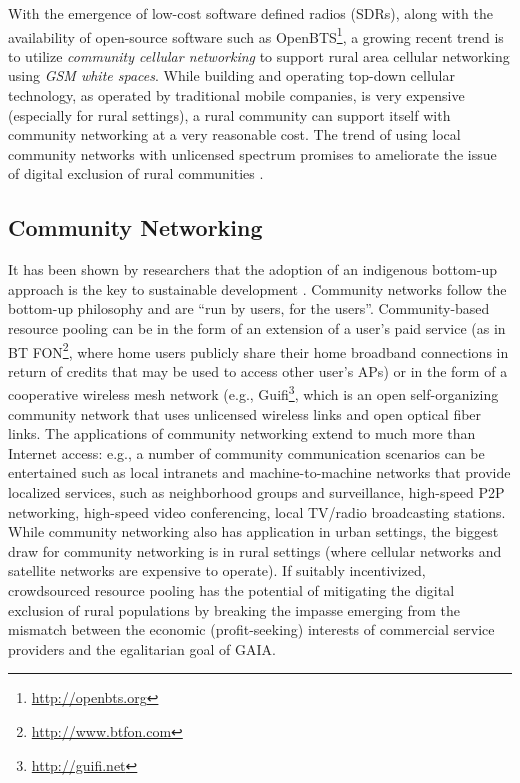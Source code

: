 \documentclass{sigcomm-alternate}
\begin{document}
With the emergence of low-cost software defined radios (SDRs), along with the availability of open-source software such as OpenBTS\footnote{\url{http://openbts.org}}, a growing recent trend is to utilize \textit{community cellular networking} to support rural area cellular networking using \textit{GSM white spaces}. While building and operating top-down cellular technology, as operated by traditional mobile companies, is very expensive (especially for rural settings),  a rural community can support itself with community networking at a very reasonable cost. The trend of using local community networks with unlicensed spectrum promises to ameliorate the issue of digital exclusion of rural communities \cite{heimerl2013local}. 
















\subsection{Community Networking}
\label{sec:communityNet}

It has been shown by researchers that the adoption of an indigenous bottom-up approach is the key to sustainable development \cite{easterly2008institutions}. Community networks follow the bottom-up philosophy and are ``run by users, for the users''. Community-based resource pooling can be in the form of an extension of a user's paid service (as in BT FON\footnote{\url{http://www.btfon.com}}, where home users publicly share their home broadband connections in return of credits that may be used to access other user's APs) or in the form of a cooperative wireless mesh network (e.g., Guifi\footnote{\url{http://guifi.net}}, which is an open self-organizing community network that uses unlicensed wireless links and open optical fiber links. The applications of community networking extend to much more than Internet access: e.g., a number of community communication scenarios can be entertained such as local intranets and machine-to-machine networks that provide localized services, such as neighborhood groups and surveillance, high-speed P2P networking, high-speed video conferencing, local TV/radio broadcasting stations. While community networking also has application in urban settings, the biggest draw for community networking is in rural settings (where cellular networks and satellite networks are expensive to operate). If suitably incentivized, crowdsourced resource pooling has the potential of mitigating the digital exclusion of rural populations by breaking the impasse emerging from the mismatch between the economic (profit-seeking) interests of commercial service providers and the egalitarian goal of GAIA. 
\end{document}
